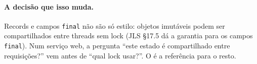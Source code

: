 \paragraph{A decisão que isso muda.}
Records e campos \texttt{final} não são só estilo: objetos imutáveis
podem ser compartilhados entre threads sem lock (JLS §17.5 dá a garantia
para os campos \texttt{final}). Num serviço web, a pergunta \enquote{este
estado é compartilhado entre requisições?} vem antes de \enquote{qual
lock usar?}. O  é a referência para o resto.

